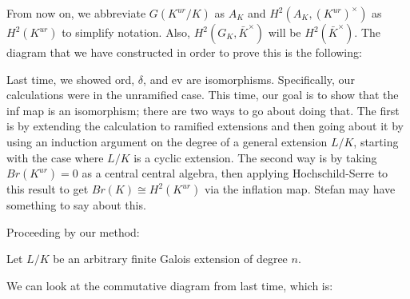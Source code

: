\begin{center}
\end{center}


From now on, we abbreviate $G(K^{ur}/K)$ as $A_K$ and $H^2(A_K, (K^{ur})^\times)$ as $H^2(K^{ur})$ to simplify notation. Also, $H^2(G_K, \bar{K}^\times)$ will be $H^2(\bar{K}^\times)$. 
The diagram that we have constructed in order to prove this is the following:


\begin{center}
\end{center}

Last time, we showed ord, $\delta$, and ev are isomorphisms. Specifically, our calculations were in the unramified case. This time, our goal is to show that the inf map is an isomorphism; there are two ways to go about doing that. The first is by extending the calculation to ramified extensions and then going about it by using an induction argument on the degree of a general extension $L/K$, starting with the case where $L/K$ is a cyclic extension. The second way is by taking $Br(K^{ur})=0$ as a central central algebra, then applying Hochschild-Serre to this result to get $Br(K)\cong H^2(K^{ur})$ via the inflation map. Stefan may have something to say about this. 

Proceeding by our method:

Let $L/K$ be an arbitrary finite Galois extension of degree $n$. 

We can look at the commutative diagram from last time, which is: 

\begin{center}
\end{center}

